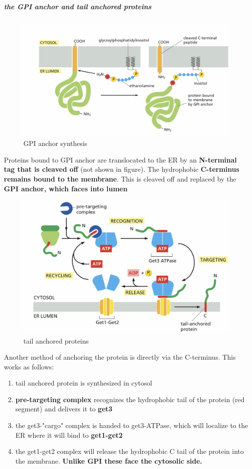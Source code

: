 \documentclass[../main.tex]{subfiles}
\begin{document}
\subparagraph{the GPI anchor and tail anchored proteins}

\begin{figure}[H]
    \centering
    \includegraphics[width=0.5\linewidth]{GPI.png}
    \caption{GPI anchor synthesis}
    \label{fig:enter-label}
\end{figure}

Proteins bound to GPI anchor are translocated to the ER by an \textbf{N-terminal tag that is cleaved off }(not shown in figure). The hydrophobic \textbf{C-terminus remains bound to the membrane}. This is cleaved off and replaced by the \textbf{GPI anchor, which faces into lumen}


\begin{figure}[H]
    \centering
    \includegraphics[width=0.5\linewidth]{tailAnchoredProteins.png}
    \caption{tail anchored proteins}
    \label{fig:enter-label}
\end{figure}
Another method of anchoring the protein is directly via the C-terminus. This works as follows:

\begin{enumerate}
    \item tail anchored protein is synthesized in cytosol
    \item \textbf{pre-targeting complex} recognizes the hydrophobic tail of the protein (red segment) and delivers it to\textbf{ \gls{get3}}
    \item the get3-"cargo" complex is handed to get3-ATPase, which will localize to the ER where it will bind to \textbf{get1-get2}
   \item the get1-get2 complex will release the hydrophobic C tail of the protein into the membrane. \textbf{Unlike GPI these face the cytosolic side.}
\end{enumerate}
\end{document}
